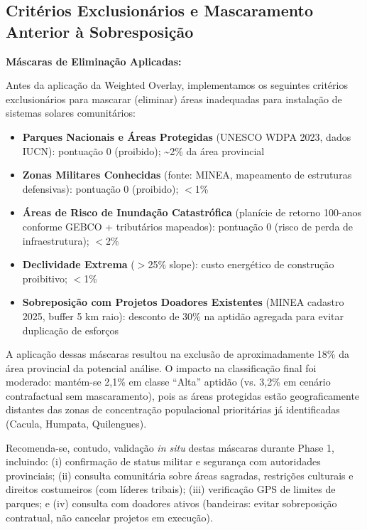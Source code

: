 \documentclass[12pt, a4paper]{article}
\begin{document}
\subsection{Critérios Exclusionários e Mascaramento Anterior à Sobresposição}


\noindent\textbf{Máscaras de Eliminação Aplicadas:}

Antes da aplicação da Weighted Overlay, implementamos os seguintes critérios exclusionários para mascarar (eliminar) áreas inadequadas para instalação de sistemas solares comunitários:

\begin{itemize}
\item \textbf{Parques Nacionais e Áreas Protegidas} (UNESCO WDPA 2023, dados IUCN): pontuação 0 (proibido); \textasciitilde{}2\% da área provincial
\item \textbf{Zonas Militares Conhecidas} (fonte: MINEA, mapeamento de estruturas defensivas): pontuação 0 (proibido); $<$1\% 
\item \textbf{Áreas de Risco de Inundação Catastrófica} (planície de retorno 100-anos conforme GEBCO + tributários mapeados): pontuação 0 (risco de perda de infraestrutura); $<$2\%
\item \textbf{Declividade Extrema} ($>$25\% slope): custo energético de construção proibitivo; $<$1\%
\item \textbf{Sobreposição com Projetos Doadores Existentes} (MINEA cadastro 2025, buffer 5 km raio): desconto de 30\% na aptidão agregada para evitar duplicação de esforços
\end{itemize}

A aplicação dessas máscaras resultou na exclusão de aproximadamente 18\% da área provincial da potencial análise. O impacto na classificação final foi moderado: mantém-se 2,1\% em classe ``Alta'' aptidão (vs. 3,2\% em cenário contrafactual sem mascaramento), pois as áreas protegidas estão geograficamente distantes das zonas de concentração populacional prioritárias já identificadas (Cacula, Humpata, Quilengues). 

Recomenda-se, contudo, validação \textit{in situ} destas máscaras durante Phase 1, incluindo: (i) confirmação de status militar e segurança com autoridades provinciais; (ii) consulta comunitária sobre áreas sagradas, restrições culturais e direitos costumeiros (com líderes tribais); (iii) verificação GPS de limites de parques; e (iv) consulta com doadores ativos (bandeiras: evitar sobreposição contratual, não cancelar projetos em execução).
\end{document}
